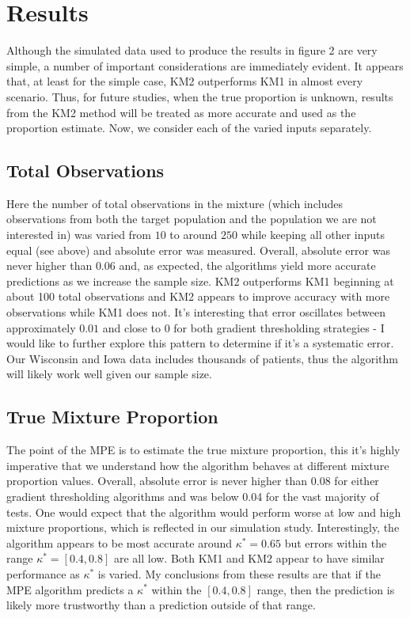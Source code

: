 \documentclass[lineno]{biometrika}
\begin{document}
\section{Results}
Although the simulated data used to produce the results in figure 2 are very simple, a number of important considerations are immediately evident. It appears that, at least for the simple case, KM2 outperforms KM1 in almost every scenario. Thus, for future studies, when the true proportion is unknown, results from the KM2 method will be treated as more accurate and used as the proportion estimate. Now, we consider each of the varied inputs separately.

\subsection{Total Observations}
Here the number of total observations in the mixture (which includes observations from both the target population and the population we are not interested in) was varied from $10$ to around $250$ while keeping all other inputs equal (see above) and absolute error was measured. Overall, absolute error was never higher than $0.06$ and, as expected, the algorithms yield more accurate predictions as we increase the sample size. KM2 outperforms KM1 beginning at about 100 total observations and KM2 appears to improve accuracy with more observations while KM1 does not. It's interesting that error oscillates between approximately $0.01$ and close to $0$ for both gradient thresholding strategies - I would like to further explore this pattern to determine if it's a systematic error. Our Wisconsin and Iowa data includes thousands of patients, thus the algorithm will likely work well given our sample size.

\subsection{True Mixture Proportion}
The point of the MPE is to estimate the true mixture proportion, this it's highly imperative that we understand how the algorithm behaves at different mixture proportion values. Overall, absolute error is never higher than 0.08 for either gradient thresholding algorithms and was below 0.04 for the vast majority of tests. One would expect that the algorithm would perform worse at low and high mixture proportions, which is reflected in our simulation study. Interestingly, the algorithm appears to be most accurate around $\kappa^* = 0.65$ but errors within the range $\kappa^* = [0.4, 0.8]$ are all low. Both KM1 and KM2 appear to have similar performance as $\kappa^*$ is varied. My conclusions from these results are that if the MPE algorithm predicts a $\kappa^*$ within the $[0.4,0.8]$ range, then the prediction is likely more trustworthy than a prediction outside of that range. 
\end{document}
